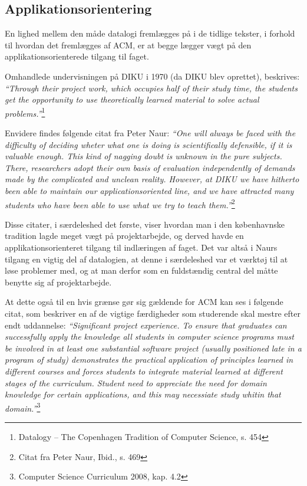 \documentclass[10pt,a4paper]{article}
\newcommand{\citat}[2]{\vspace{0.1cm}\newline\textit{``#1''}\hspace{0.1cm}\footnote{#2}\vspace{0.1cm}\newline}
\begin{document}
\subsection{Applikationsorientering}
En lighed mellem den måde datalogi fremlægges på i de tidlige tekster, i forhold
til hvordan det fremlægges af ACM, er at begge lægger vægt på den
applikationsorienterede tilgang til faget.

Omhandlede undervisningen på DIKU i 1970 (da DIKU blev oprettet), beskrives:
\citat{Through their project work, which occupies half of their study time, the
    students get the opportunity to use theoretically learned material to solve
    actual problems.}{Datalogy -- The Copenhagen Tradition of Computer
    Science, s. 454}

Envidere findes følgende citat fra Peter Naur: \citat{One will always be faced
    with the difficulty of deciding wheter what one is doing is scientifically
    defensible, if it is valuable enough. This kind of nagging doubt is unknown
    in the pure subjects. There, researchers adopt their own basis of evaluation
    independently of demands made by the complicated and unclean reality.
    However, at DIKU we have hitherto been able to maintain our
    applicationsoriented line, and we have attracted many students who have been
    able to use what we try to teach them.}{Citat fra Peter Naur, Ibid., s. 469}

Disse citater, i særdeleshed det første, viser hvordan man i den københavnske
tradition lagde meget vægt på projektarbejde, og derved havde en
applikationsorienteret tilgang til indlæringen af faget. Det var altså i Naurs
tilgang en vigtig del af datalogien, at denne i særdeleshed var et værktøj til
at løse problemer med, og at man derfor som en fuldstændig central del måtte
benytte sig af projektarbejde.

At dette også til en hvis grænse gør sig gældende for ACM kan ses i følgende
citat, som beskriver en af de vigtige færdigheder som studerende skal mestre
efter endt uddannelse: \citat{\emph{Significant project experience}. To ensure
    that graduates can successfully apply the knowledge all students in computer
    science programs must be involved in at least one substantial software
    project (usually positioned late in a program of study) demonstrates the
    practical application of principles learned in different courses and forces
    students to integrate material learned at different stages of the
    curriculum. Student need to appreciate the need for domain knowledge for
    certain applications, and this may necessiate study whitin that
    domain.}{Computer Science Curriculum 2008, kap. 4.2}
\end{document}

